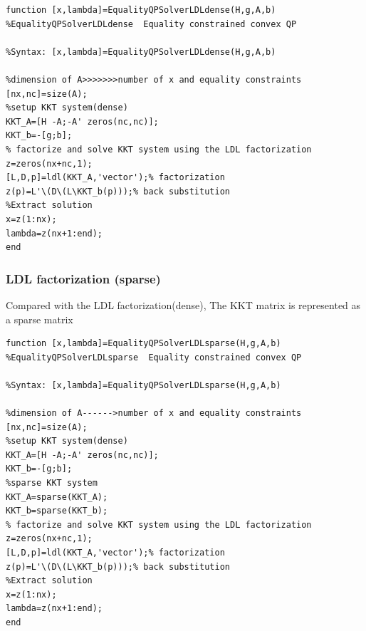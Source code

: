 {\setmainfont{Courier New Bold}  \scriptsize           
\begin{lstlisting}
function [x,lambda]=EqualityQPSolverLDLdense(H,g,A,b)
%EqualityQPSolverLDLdense  Equality constrained convex QP

%Syntax: [x,lambda]=EqualityQPSolverLDLdense(H,g,A,b)

%dimension of A>>>>>>>number of x and equality constraints
[nx,nc]=size(A);
%setup KKT system(dense)
KKT_A=[H -A;-A' zeros(nc,nc)];
KKT_b=-[g;b];
% factorize and solve KKT system using the LDL factorization
z=zeros(nx+nc,1);
[L,D,p]=ldl(KKT_A,'vector');% factorization
z(p)=L'\(D\(L\KKT_b(p)));% back substitution
%Extract solution
x=z(1:nx);
lambda=z(nx+1:end);
end
\end{lstlisting}}



\subsubsection{\bfseries LDL factorization (sparse)}
Compared with the LDL factorization(dense), The KKT matrix is represented as a sparse matrix

{\setmainfont{Courier New Bold}   \scriptsize          
\begin{lstlisting}
function [x,lambda]=EqualityQPSolverLDLsparse(H,g,A,b)
%EqualityQPSolverLDLsparse  Equality constrained convex QP

%Syntax: [x,lambda]=EqualityQPSolverLDLsparse(H,g,A,b)

%dimension of A------>number of x and equality constraints
[nx,nc]=size(A);
%setup KKT system(dense)
KKT_A=[H -A;-A' zeros(nc,nc)];
KKT_b=-[g;b];
%sparse KKT system
KKT_A=sparse(KKT_A);
KKT_b=sparse(KKT_b);
% factorize and solve KKT system using the LDL factorization
z=zeros(nx+nc,1);
[L,D,p]=ldl(KKT_A,'vector');% factorization
z(p)=L'\(D\(L\KKT_b(p)));% back substitution
%Extract solution
x=z(1:nx);
lambda=z(nx+1:end);
end
\end{lstlisting}}



